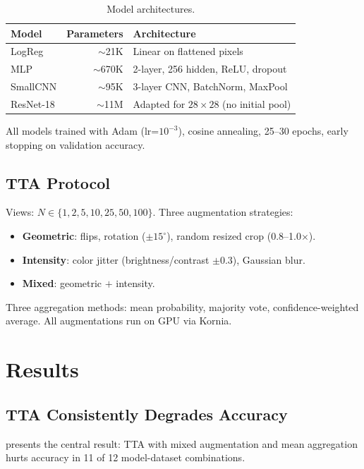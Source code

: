 \documentclass{article}
\theoremstyle{plain}
\theoremstyle{definition}
\theoremstyle{remark}
\begin{document}
\begin{table}[h]
\centering
\caption{Model architectures.}
\label{tab:models}
\begin{tabular}{@{}lrl@{}}
\toprule
Model & Parameters & Architecture \\
\midrule
LogReg & $\sim$21K & Linear on flattened pixels \\
MLP & $\sim$670K & 2-layer, 256 hidden, ReLU, dropout \\
SmallCNN & $\sim$95K & 3-layer CNN, BatchNorm, MaxPool \\
ResNet-18 & $\sim$11M & Adapted for $28\times28$ (no initial pool) \\
\bottomrule
\end{tabular}
\end{table}

All models trained with Adam (lr=$10^{-3}$), cosine annealing, 25--30 epochs, early stopping on validation accuracy.

\subsection{TTA Protocol}
Views: $N \in \{1, 2, 5, 10, 25, 50, 100\}$. Three augmentation strategies:
\begin{itemize}
    \item \textbf{Geometric}: flips, rotation ($\pm 15^\circ$), random resized crop (0.8--1.0$\times$).
    \item \textbf{Intensity}: color jitter (brightness/contrast $\pm 0.3$), Gaussian blur.
    \item \textbf{Mixed}: geometric $+$ intensity.
\end{itemize}
Three aggregation methods: mean probability, majority vote, confidence-weighted average. All augmentations run on GPU via Kornia.

\section{Results}
\label{sec:experiments}

\subsection{TTA Consistently Degrades Accuracy}
\label{sec:scaling}

 presents the central result: TTA with mixed augmentation and mean aggregation hurts accuracy in 11 of 12 model-dataset combinations.
\end{document}
